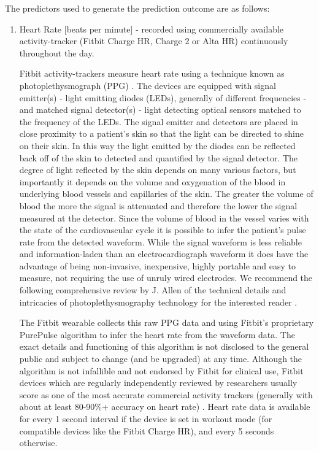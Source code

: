 \documentclass[]{article}
\begin{document}
The predictors used to generate the prediction outcome are as follows:
\begin{enumerate}
	\item Heart Rate [beats per minute] - recorded using commercially available activity-tracker (Fitbit Charge HR, Charge 2 or Alta HR) continuously throughout the day.
	
	Fitbit activity-trackers measure heart rate using a technique known as photoplethysmograph (PPG) \cite{FitbitInc.2017,Abdulmajeed2016}. The devices are equipped with signal emitter(s) - light emitting diodes (LEDs), generally of different frequencies - and matched signal detector(s) - light detecting optical sensors matched to the frequency of the LEDs. The signal emitter and detectors are placed in close proximity to a patient's skin so that the light can be directed to shine on their skin. In this way the light emitted by the diodes can be reflected back off of the skin to detected and quantified by the signal detector. The degree of light reflected by the skin depends on many various factors, but importantly it depends on the volume and oxygenation of the blood in underlying blood vessels and capillaries of the skin. The greater the volume of blood the more the signal is attenuated and therefore the lower the signal measured at the detector. Since the volume of blood in the vessel varies with the state of the cardiovascular cycle it is possible to infer the patient's pulse rate from the detected waveform. While the signal waveform is less reliable and information-laden than an electrocardiograph waveform it does have the advantage of being non-invasive, inexpensive, highly portable and easy to measure, not requiring the use of unruly wired electrodes. We recommend the following comprehensive review by J. Allen of the technical details and intricacies of photoplethysmography technology for the interested reader \cite{Allen2007}.
	
	The Fitbit wearable collects this raw PPG data and using Fitbit's proprietary PurePulse algorithm to infer the heart rate from the waveform data\cite{FitbitInc.2017}. The exact details and functioning of this algorithm is not disclosed to the general public and subject to change (and be upgraded) at any time. Although the algorithm is not infallible and not endorsed by Fitbit for clinical use, Fitbit devices which are regularly independently reviewed by researchers usually score as one of the most accurate commercial activity trackers (generally with about at least 80-90\%+ accuracy on heart rate) \cite{Wang2016a,El-Amrawy2015,Ferguson2015,Kooiman2015,Wen2017,Abdulmajeed2016}. Heart rate data is available for every 1 second interval if the device is set in workout mode (for compatible devices like the Fitbit Charge HR), and every 5 seconds otherwise\cite{Abdulmajeed2016}. 
	

\end{enumerate}
\end{document}
